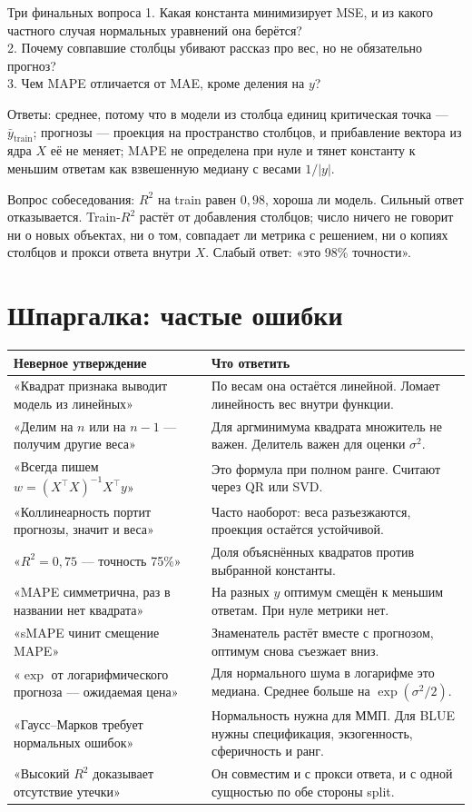 \documentclass[11pt,a4paper]{article}
\begin{document}
\begin{saybox}{Три финальных вопроса}
1. Какая константа минимизирует MSE, и из какого частного случая нормальных уравнений она берётся?\\
2. Почему совпавшие столбцы убивают рассказ про вес, но не обязательно прогноз?\\
3. Чем MAPE отличается от MAE, кроме деления на \(y\)?
\end{saybox}

Ответы: среднее, потому что в модели из столбца единиц критическая точка --- \(\bar y_{\mathrm{train}}\); прогнозы --- проекция на пространство столбцов, и прибавление вектора из ядра \(X\) её не меняет; MAPE не определена при нуле и тянет константу к меньшим ответам как взвешенную медиану с весами \(1/|y|\).

Вопрос собеседования: \(R^{2}\) на train равен \(0{,}98\), хороша ли модель. Сильный ответ отказывается. Train-\(R^{2}\) растёт от добавления столбцов; число ничего не говорит ни о новых объектах, ни о том, совпадает ли метрика с решением, ни о копиях столбцов и прокси ответа внутри \(X\). Слабый ответ: «это 98\% точности».

\section{Шпаргалка: частые ошибки}

{\small\begin{longtable}{@{}P{58mm}P{99mm}@{}}
\toprule
Неверное утверждение & Что ответить\\
\midrule
\endhead
«Квадрат признака выводит модель из линейных» & По весам она остаётся линейной. Ломает линейность вес внутри функции.\\
«Делим на \(n\) или на \(n-1\) --- получим другие веса» & Для аргминимума квадрата множитель не важен. Делитель важен для оценки \(\sigma^{2}\).\\
«Всегда пишем \(w=(X^{\top}X)^{-1}X^{\top}y\)» & Это формула при полном ранге. Считают через QR или SVD.\\
«Коллинеарность портит прогнозы, значит и веса» & Часто наоборот: веса разъезжаются, проекция остаётся устойчивой.\\
«\(R^{2}=0{,}75\) --- точность 75\%» & Доля объяснённых квадратов против выбранной константы.\\
«MAPE симметрична, раз в названии нет квадрата» & На разных \(y\) оптимум смещён к меньшим ответам. При нуле метрики нет.\\
«sMAPE чинит смещение MAPE» & Знаменатель растёт вместе с прогнозом, оптимум снова съезжает вниз.\\
«\(\exp\) от логарифмического прогноза --- ожидаемая цена» & Для нормального шума в логарифме это медиана. Среднее больше на \(\exp(\sigma^{2}/2)\).\\
«Гаусс--Марков требует нормальных ошибок» & Нормальность нужна для ММП. Для BLUE нужны спецификация, экзогенность, сферичность и ранг.\\
«Высокий \(R^{2}\) доказывает отсутствие утечки» & Он совместим и с прокси ответа, и с одной сущностью по обе стороны split.\\
\bottomrule
\end{longtable}}
\end{document}
